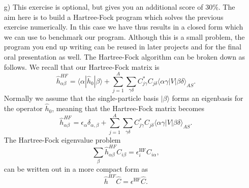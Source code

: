 \documentclass[11pt,a4wide]{article}
\begin{document}
\begin{enumerate}
\item[g)] This exercise is optional, but gives you an additional score of 30\%.
The aim here is to build a Hartree-Fock program which solves the previous exercise numerically. In this case we have thus
results in a closed form which we can use to benchmark our program. Although this is a small problem, the program you end up writing
can be reused in later projects and for the final oral presentation as well. 
The Hartree-Fock algorithm can be broken down as follows. We recall that 
our Hartree-Fock matrix  is 
\[
\hat{h}_{\alpha\beta}^{HF}=\langle \alpha | \hat{h}_0 | \beta \rangle+
\sum_{j=1}^A\sum_{\gamma\delta} C^*_{j\gamma}C_{j\delta}\langle \alpha\gamma|V|\beta\delta\rangle_{AS}.
\]
Normally we assume that the single-particle basis $|\beta\rangle$ forms an eigenbasis for the operator
$\hat{h}_0$, meaning that the Hartree-Fock matrix becomes  
\[
\hat{h}_{\alpha\beta}^{HF}=\epsilon_{\alpha}\delta_{\alpha,\beta}+
\sum_{j=1}^A\sum_{\gamma\delta} C^*_{j\gamma}C_{j\delta}\langle \alpha\gamma|V|\beta\delta\rangle_{AS}.
\]
The Hartree-Fock eigenvalue problem
\[
\sum_{\beta}\hat{h}_{\alpha\beta}^{HF}C_{i\beta}=\epsilon_i^{\mathrm{HF}}C_{i\alpha},
\]
can be written out in a more compact form as
\[
\hat{h}^{HF}\hat{C}=\epsilon^{\mathrm{HF}}\hat{C}. 
\]


\end{enumerate}
\end{document}

